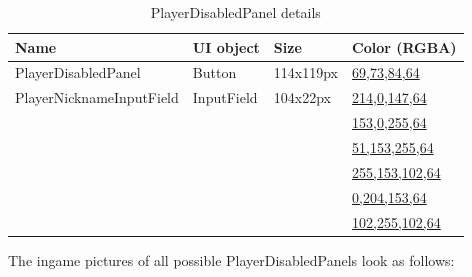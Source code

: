 \begin{table}[h!]\centering
	\caption{PlayerDisabledPanel details}
	\begin{tabular}{|C{4cm}|C{4cm}|C{4cm}|C{4cm}|}
		\hline
		\textbf{Name} & \textbf{UI object} & \textbf{Size} & \textbf{Color (RGBA)} \\\hline
		PlayerDisabledPanel & Button & 114x119px & \hyperref[gui-colors]{69,73,84,64} \\\hline
		PlayerNicknameInputField & InputField & 104x22px & \hyperref[gui-colors]{214,0,147,64} \\
		& & & \hyperref[gui-colors]{153,0,255,64} \\
		& & & \hyperref[gui-colors]{51,153,255,64} \\
		& & & \hyperref[gui-colors]{255,153,102,64} \\
		& & & \hyperref[gui-colors]{0,204,153,64} \\
		& & & \hyperref[gui-colors]{102,255,102,64} \\\hline
	\end{tabular}
\end{table}

\noindent The ingame pictures of all possible PlayerDisabledPanels look as follows:

